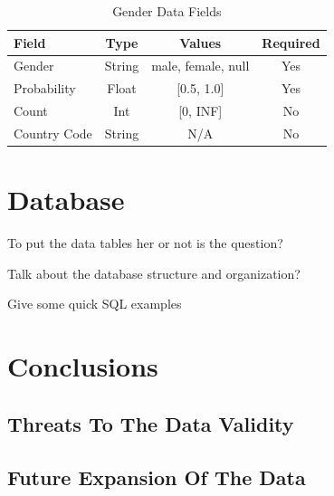 \documentclass{article}
\begin{document}
\begin{table}[t]
    \begin{center}
        \caption{Gender Data Fields}
        \label{tab:gen_data}
        \begin{tabular}{| l |c | c | c |}
            \hline
            \textbf{Field} & \textbf{Type} & \textbf{Values} & \textbf{Required}\\
            \hline
            Gender & String & {male, female, null} & Yes\\
            Probability & Float & [0.5, 1.0] & Yes\\ 
            Count & Int & [0, INF] & No\\
            Country Code & String & N/A & No\\
            \hline
        \end{tabular}
    \end{center}
\end{table}


\section{Database}
To put the data tables her or not is the question?

Talk about the database structure and organization?

Give some quick SQL examples

\section{Conclusions}
\subsection{Threats To The Data Validity}

\subsection{Future Expansion Of The Data}


\newpage



\end{document}
